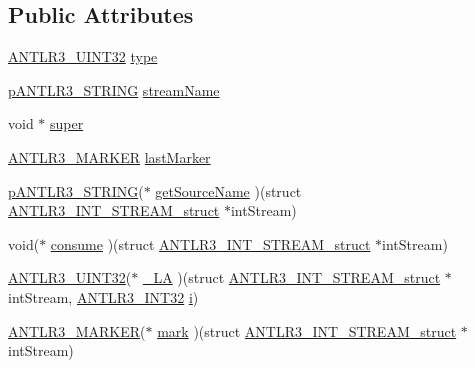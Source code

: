 \subsection*{Public Attributes}
\begin{DoxyCompactItemize}
\item 
\hyperlink{antlr3defs_8h_ac41f744abd0fd25144b9eb9d11b1dfd1}{A\-N\-T\-L\-R3\-\_\-\-U\-I\-N\-T32} \hyperlink{struct_a_n_t_l_r3___i_n_t___s_t_r_e_a_m__struct_a43cdca646646b19cb679ca87f45b03f8}{type}
\item 
\hyperlink{antlr3interfaces_8h_a36bbe7362079348864db4b4dbdcce56b}{p\-A\-N\-T\-L\-R3\-\_\-\-S\-T\-R\-I\-N\-G} \hyperlink{struct_a_n_t_l_r3___i_n_t___s_t_r_e_a_m__struct_a8071957bbe514572d50d61500ee054e5}{stream\-Name}
\item 
void $\ast$ \hyperlink{struct_a_n_t_l_r3___i_n_t___s_t_r_e_a_m__struct_a6f5f3b5448e33c1e083849ca67465d05}{super}
\item 
\hyperlink{antlr3defs_8h_a0361e6bf442e07afe923e4d05e9ebc4f}{A\-N\-T\-L\-R3\-\_\-\-M\-A\-R\-K\-E\-R} \hyperlink{struct_a_n_t_l_r3___i_n_t___s_t_r_e_a_m__struct_af2daa94a7e071dc3acad6deb01ecae5c}{last\-Marker}
\item 
\hyperlink{antlr3interfaces_8h_a36bbe7362079348864db4b4dbdcce56b}{p\-A\-N\-T\-L\-R3\-\_\-\-S\-T\-R\-I\-N\-G}($\ast$ \hyperlink{struct_a_n_t_l_r3___i_n_t___s_t_r_e_a_m__struct_ad71ca21244172b4a0dc36efa8fbeec53}{get\-Source\-Name} )(struct \hyperlink{struct_a_n_t_l_r3___i_n_t___s_t_r_e_a_m__struct}{A\-N\-T\-L\-R3\-\_\-\-I\-N\-T\-\_\-\-S\-T\-R\-E\-A\-M\-\_\-struct} $\ast$int\-Stream)
\item 
void($\ast$ \hyperlink{struct_a_n_t_l_r3___i_n_t___s_t_r_e_a_m__struct_a94cc34ff782903d0d2b91595f308062a}{consume} )(struct \hyperlink{struct_a_n_t_l_r3___i_n_t___s_t_r_e_a_m__struct}{A\-N\-T\-L\-R3\-\_\-\-I\-N\-T\-\_\-\-S\-T\-R\-E\-A\-M\-\_\-struct} $\ast$int\-Stream)
\item 
\hyperlink{antlr3defs_8h_ac41f744abd0fd25144b9eb9d11b1dfd1}{A\-N\-T\-L\-R3\-\_\-\-U\-I\-N\-T32}($\ast$ \hyperlink{struct_a_n_t_l_r3___i_n_t___s_t_r_e_a_m__struct_abc96e456bf8fdbb01b869b1ab9e27e5a}{\-\_\-\-L\-A} )(struct \hyperlink{struct_a_n_t_l_r3___i_n_t___s_t_r_e_a_m__struct}{A\-N\-T\-L\-R3\-\_\-\-I\-N\-T\-\_\-\-S\-T\-R\-E\-A\-M\-\_\-struct} $\ast$int\-Stream, \hyperlink{antlr3defs_8h_a6faef5c4687f8eb633d2aefea93973ca}{A\-N\-T\-L\-R3\-\_\-\-I\-N\-T32} \hyperlink{_read_d_m3___matlab_8m_a6f6ccfcf58b31cb6412107d9d5281426}{i})
\item 
\hyperlink{antlr3defs_8h_a0361e6bf442e07afe923e4d05e9ebc4f}{A\-N\-T\-L\-R3\-\_\-\-M\-A\-R\-K\-E\-R}($\ast$ \hyperlink{struct_a_n_t_l_r3___i_n_t___s_t_r_e_a_m__struct_ad59b7290943c5152aa28377343335983}{mark} )(struct \hyperlink{struct_a_n_t_l_r3___i_n_t___s_t_r_e_a_m__struct}{A\-N\-T\-L\-R3\-\_\-\-I\-N\-T\-\_\-\-S\-T\-R\-E\-A\-M\-\_\-struct} $\ast$int\-Stream)

\end{DoxyCompactItemize}

